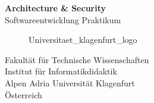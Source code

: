 \begin{titlepage}
    \begin{center}
        \vspace*{1cm}
        \Huge
        \textbf{Architecture \& Security}\\
        \LARGE
        \vspace{0.5cm}
        Softwareentwicklung Praktikum\\ 

        \vspace{1.5cm}


        \Large

        \vspace{3cm}

        \begin{figure}[htp]
            \centering
            {Universitaet_klagenfurt_logo}
        \end{figure}
        Fakultät für Technische Wissenschaften\\
        Institut für Informatikdidaktik\\
        Alpen Adria Universität Klagenfurt\\
        Österreich\\
        \datumVonHeute

    \end{center}
\end{titlepage}
